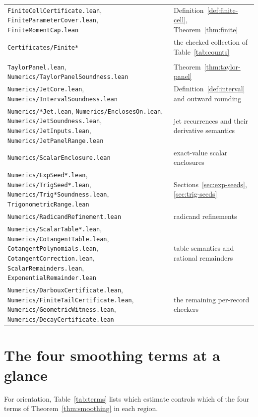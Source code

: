 \documentclass[10pt,a4paper]{article}
\theoremstyle{plain}
\theoremstyle{definition}
\newcommand{\file}[1]{\texttt{#1}}
\begin{document}
{\begin{longtable}{@{}p{5.6cm}p{9.2cm}@{}}
\file{FiniteCellCertificate.lean}, \file{FiniteParameterCover.lean}, \file{FiniteMomentCap.lean} & Definition~\ref{def:finite-cell}, Theorem~\ref{thm:finite} \\
\file{Certificates/Finite*} & the checked collection of Table~\ref{tab:counts} \\
\addlinespace
\multicolumn{2}{@{}l}{\emph{Numerics infrastructure}}\\
\file{TaylorPanel.lean}, \file{Numerics/TaylorPanelSoundness.lean} & Theorem~\ref{thm:taylor-panel} \\
\file{Numerics/JetCore.lean}, \file{Numerics/IntervalSoundness.lean} & Definition~\ref{def:interval} and outward rounding \\
\file{Numerics/*Jet.lean}, \file{Numerics/EnclosesOn.lean}, \file{Numerics/JetSoundness.lean}, \file{Numerics/JetInputs.lean}, \file{Numerics/JetPanelRange.lean} & jet recurrences and their derivative semantics \\
\file{Numerics/ScalarEnclosure.lean} & exact-value scalar enclosures \\
\file{Numerics/ExpSeed*.lean}, \file{Numerics/TrigSeed*.lean}, \file{Numerics/Trig*Soundness.lean}, \file{TrigonometricRange.lean} & Sections~\ref{sec:exp-seeds}, \ref{sec:trig-seeds} \\
\file{Numerics/RadicandRefinement.lean} & radicand refinements \\
\file{Numerics/ScalarTable*.lean}, \file{Numerics/CotangentTable.lean}, \file{CotangentPolynomials.lean}, \file{CotangentCorrection.lean}, \file{ScalarRemainders.lean}, \file{ExponentialRemainder.lean} & table semantics and rational remainders \\
\file{Numerics/DarbouxCertificate.lean}, \file{Numerics/FiniteTailCertificate.lean}, \file{Numerics/GeometricWitness.lean}, \file{Numerics/DecayCertificate.lean} & the remaining per-record checkers \\
\bottomrule
\end{longtable}
}

\section{The four smoothing terms at a glance}

For orientation, Table~\ref{tab:terms} lists which estimate controls which of
the four terms of Theorem~\ref{thm:smoothing} in each region.
\end{document}
